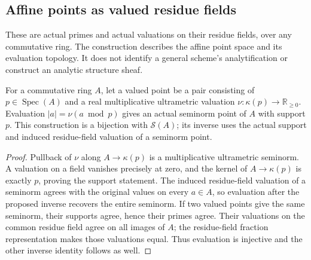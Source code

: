 \subsection{Affine points as valued residue fields}
\label{subsec:valued-spectrum-points}

These are actual primes and actual valuations on their residue fields,
over any commutative ring. The construction describes the affine point
space and its evaluation topology. It does not identify a general scheme's
analytification or construct an analytic structure sheaf.

\begin{theorem}
\label{spectrum:valued-point-equivalence}
\leanok
{}
For a commutative ring $A$, let a valued point be a pair consisting of
$p\in\operatorname{Spec}(A)$ and a real multiplicative ultrametric valuation
$\nu:\kappa(p)\to\mathbb R_{\ge0}$. Evaluation
$|a|=\nu(a\bmod p)$ gives an actual seminorm point of $A$ with support $p$.
This construction is a bijection with $\mathcal S(A)$; its inverse uses
the actual support and induced residue-field valuation of a seminorm point.
\end{theorem}
\begin{proof}
Pullback of $\nu$ along $A\to\kappa(p)$ is a multiplicative ultrametric
seminorm. A valuation on a field vanishes precisely at zero, and the
kernel of $A\to\kappa(p)$ is exactly $p$, proving the support statement.
The induced residue-field valuation of a seminorm agrees with the original
values on every $a\in A$, so evaluation after the proposed inverse
recovers the entire seminorm. If two valued points give the same
seminorm, their supports agree, hence their primes agree. Their valuations
on the common residue field agree on all images of $A$; the residue-field
fraction representation makes those valuations equal. Thus evaluation is
injective and the other inverse identity follows as well.
\end{proof}


